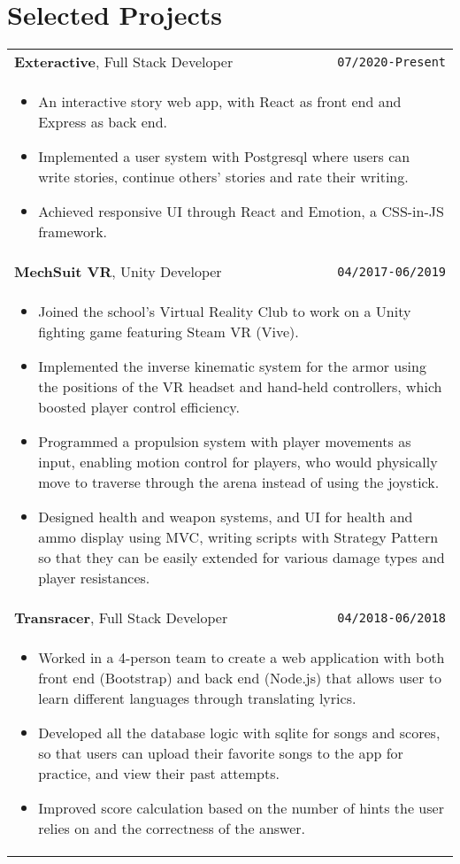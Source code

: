 \documentclass[10pt, letterpaper]{article}
\newcommand{\itemcols}[1]{
\multicolumn{2}{p{\dimexpr \linewidth-2\tabcolsep}}{
\begin{itemize}
#1
\end{itemize}
}
}
\begin{document}
\section{Selected Projects}
\smallskip
\noindent
\begin{tabularx}{\linewidth}{X r}
\textbf{\large Exteractive}, Full Stack Developer & \texttt{07/2020-Present} \\
\itemcols{
\item An interactive story web app, with React as front end and Express as back end.
\item Implemented a user system with Postgresql where users can write stories, continue others' stories and rate their writing.
\item Achieved responsive UI through React and Emotion, a CSS-in-JS framework.
} \\

\textbf{\large MechSuit VR}, Unity Developer & \texttt{04/2017-06/2019} \\
\itemcols{
\item Joined the school's Virtual Reality Club to work on a Unity fighting game featuring Steam VR (Vive).
\item Implemented the inverse kinematic system for the armor using the positions of the VR headset and hand-held controllers, which boosted player control efficiency.
\item Programmed a propulsion system with player movements as input, enabling motion control for players, who would physically move to traverse through the arena instead of using the joystick.
\item Designed health and weapon systems, and UI for health and ammo display using MVC, writing scripts with Strategy Pattern so that they can be easily extended for various damage types and player resistances.
} \\

\textbf{\large Transracer}, Full Stack Developer & \texttt{04/2018-06/2018} \\
\itemcols{
\item Worked in a 4-person team to create a web application with both front end (Bootstrap) and back end (Node.js) that allows user to learn different languages through translating lyrics.
\item Developed all the database logic with sqlite for songs and scores, so that users can upload their favorite songs to the app for practice, and view their past attempts.
\item Improved score calculation based on the number of hints the user relies on and the correctness of the answer.
} \\

\end{tabularx}
\end{document}
